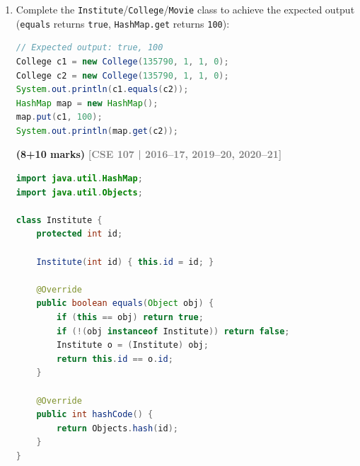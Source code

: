 \documentclass[12pt,a3paper]{article}
\newcommand{\yr}[1]{\hfill\textcolor{gray}{\small\textbf{[#1]}}}
\newcommand{\mk}[1]{\textcolor{orange!70!black}{\small\textbf{(#1 marks)}}}
\begin{document}
\begin{enumerate}
\begin{tcolorbox}
\begin{lstlisting}[language=Java]
    @Override
    public int hashCode() {
        return Objects.hash(title, releaseYear, runningTime);
    }
}

class MovieDemo {
    public static void main(String[] args) {
        Movie m1 = new Movie("The Lord of the Rings",
                             2001, "New Line Cinema", 178);
        Movie m2 = new Movie("The Lord of the Rings",
                             2001, "WingNut Films", 178);

        System.out.println(m1 == m2);        // false
        System.out.println(m1.equals(m2));   // true

        HashMap map = new HashMap();
        map.put(m1, 93);
        System.out.println(map.get(m2));     // 93
    }
}
\end{lstlisting}
\end{tcolorbox}

\item Complete the \texttt{Institute}/\texttt{College}/\texttt{Movie} class to achieve the expected output (\texttt{equals} returns \texttt{true}, \texttt{HashMap.get} returns \texttt{100}):
\begin{lstlisting}[language=Java]
// Expected output: true, 100
College c1 = new College(135790, 1, 1, 0);
College c2 = new College(135790, 1, 1, 0);
System.out.println(c1.equals(c2));
HashMap map = new HashMap();
map.put(c1, 100);
System.out.println(map.get(c2));
\end{lstlisting}
\mk{8+10}
\yr{CSE 107 | 2016--17, 2019--20, 2020--21}

\begin{tcolorbox}[enhanced,breakable,ansbox,
  colback=cC!4,colframe=cC,boxrule=0.8pt,arc=5pt,
  title={\textbf{Answer --- Institute/College: equals and hashCode}},
  fonttitle=\bfseries\color{white},colbacktitle=cC]
\begin{lstlisting}[language=Java]
import java.util.HashMap;
import java.util.Objects;

class Institute {
    protected int id;

    Institute(int id) { this.id = id; }

    @Override
    public boolean equals(Object obj) {
        if (this == obj) return true;
        if (!(obj instanceof Institute)) return false;
        Institute o = (Institute) obj;
        return this.id == o.id;
    }

    @Override
    public int hashCode() {
        return Objects.hash(id);
    }
}


\end{lstlisting}
\end{tcolorbox}
\end{enumerate}
\end{document}
